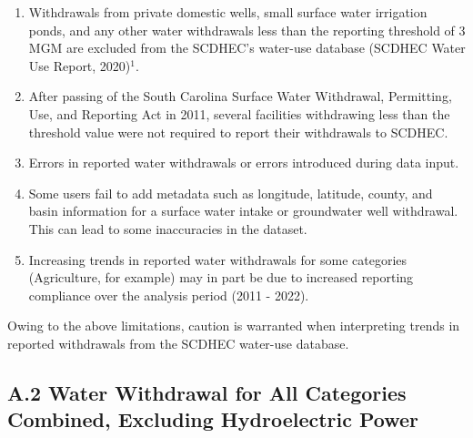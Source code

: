 \documentclass[
]{article}
\providecommand{\tightlist}{%
  \setlength{\itemsep}{0pt}\setlength{\parskip}{0pt}}
\begin{document}
\begin{enumerate}
\def\labelenumi{\arabic{enumi}.}
\tightlist
\item
  Withdrawals from private domestic wells, small surface water
  irrigation ponds, and any other water withdrawals less than the
  reporting threshold of 3 MGM are excluded from the SCDHEC's water-use
  database (SCDHEC Water Use Report, 2020)\(^1\).
\item
  After passing of the South Carolina Surface Water Withdrawal,
  Permitting, Use, and Reporting Act in 2011, several facilities
  withdrawing less than the threshold value were not required to report
  their withdrawals to SCDHEC.
\item
  Errors in reported water withdrawals or errors introduced during data
  input.
\item
  Some users fail to add metadata such as longitude, latitude, county,
  and basin information for a surface water intake or groundwater well
  withdrawal. This can lead to some inaccuracies in the dataset.
\item
  Increasing trends in reported water withdrawals for some categories
  (Agriculture, for example) may in part be due to increased reporting
  compliance over the analysis period (2011 - 2022).
\end{enumerate}

Owing to the above limitations, caution is warranted when interpreting
trends in reported withdrawals from the SCDHEC water-use database.

\hypertarget{a.2-water-withdrawal-for-all-categories-combined-excluding-hydroelectric-power}{%
\subsection{A.2 Water Withdrawal for All Categories Combined, Excluding
Hydroelectric
Power}\label{a.2-water-withdrawal-for-all-categories-combined-excluding-hydroelectric-power}}
\end{document}
